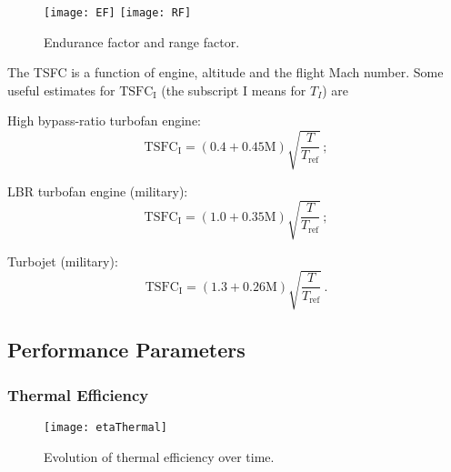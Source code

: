 \begin{figure}[!b!]
  \begin{center}
    \texttt{[image: EF]}
    \texttt{[image: RF]}
    \caption{\label{fig:EFRF}Endurance factor and range factor.}
  \end{center}
\end{figure}

The TSFC is a function of engine, altitude and the flight Mach number. Some useful estimates for $\text{TSFC}_\text{I}$ (the subscript I means for $T_I$) are
\begin{itemizePacked}
\item High bypass-ratio turbofan engine:
  \begin{equation}
  \text{TSFC}_\text{I} = (0.4 + 0.45 \text{M}) \sqrt{\frac{T}{T_\text{ref}}} \, ;
  \end{equation}
\item LBR turbofan engine (military):
  \begin{equation}
  \text{TSFC}_\text{I} = (1.0 + 0.35 \text{M}) \sqrt{\frac{T}{T_\text{ref}}} \, ;
  \end{equation}
\item Turbojet (military):
  \begin{equation}
  \text{TSFC}_\text{I} = (1.3 + 0.26 \text{M}) \sqrt{\frac{T}{T_\text{ref}}} \, .
  \end{equation}
\end{itemizePacked}

\subsection{Performance Parameters}

\subsubsection{Thermal Efficiency}

\begin{figure}[!b!]
  \begin{center}
    \texttt{[image: etaThermal]}
    \caption{\label{fig:ETA_THERMAL}Evolution of thermal efficiency over time.}
  \end{center}
\end{figure} 

